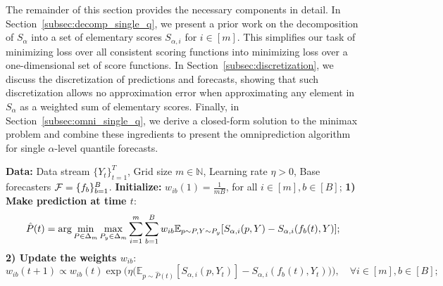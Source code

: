 The remainder of this section provides the necessary components in detail. In Section~\ref{subsec:decomp_single_q}, we present a prior work on the decomposition of $S_\alpha$ into a set of elementary scores $S_{\alpha, i}$ for $i \in [m]$. This simplifies our task of minimizing loss over all consistent scoring functions into minimizing loss over a one-dimensional set of score functions. In Section~\ref{subsec:discretization}, we discuss the discretization of predictions and forecasts, showing that such discretization allows no approximation error when approximating any element in $S_\alpha$ as a weighted sum of elementary scores. Finally, in Section~\ref{subsec:omni_single_q}, we derive a closed-form solution to the minimax problem and combine these ingredients to present the omniprediction algorithm for single $\alpha$-level quantile forecasts.




\begin{algorithm}[h]
  \caption{Online version of two-player game method} \label{alg:omni-twoplayer_online}
  \begin{algorithmic}[1]
  \State \textbf{Data:} Data stream $\{Y_t\}_{t=1}^T$, Grid size $m \in \mathbb{N}$, Learning rate $\eta > 0$, Base forecasters $\mathcal{F} = \{f_b\}_{b=1}^{B}$.
  \State \textbf{Initialize:} $w_{ib}(1) = \frac{1}{mB}$, for all $i \in [m], b \in [B]$;
  \State \textbf{1) Make prediction at time $t$}:
  \begin{align*} %
  \hat{P}(t) = \arg\min_{P \in \Delta_m} \max_{P_y \in \Delta_m} \sum_{i=1}^m \sum_{b=1}^B w_{ib}\E_{p\sim P, Y \sim P_y}[S_{\alpha, i}(p,Y) - S_{\alpha, i}(f_b(t),Y)];
  \end{align*}
  \State \textbf{2) Update the weights $w_{ib}$}:
  \[
  w_{ib}(t+1) \propto w_{ib}(t) \exp\bigl(\eta \big(\mathbb{E}_{p \sim \hat{P}(t)}[S_{\alpha, i}(p, Y_t)] 
  - S_{\alpha, i}(f_b(t), Y_t)\big)\bigr), \quad \forall i \in [m], b \in [B];
  \]
  \EndFor
  \end{algorithmic}
\end{algorithm}





